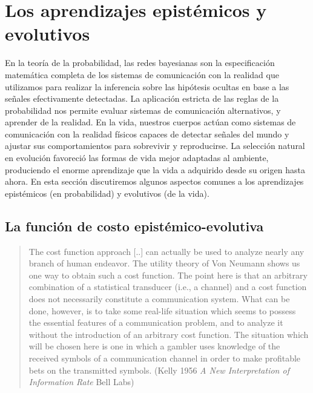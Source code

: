 \documentclass[a4paper,11pt]{book}
\theoremstyle{definition}
\begin{document}
\section{Los aprendizajes epist\'emicos y evolutivos}

En la teor\'ia de la probabilidad, las redes bayesianas son la especificaci\'on matem\'atica completa de los sistemas de comunicaci\'on con la realidad que utilizamos para realizar la inferencia sobre las hip\'otesis ocultas en base a las se\~nales efectivamente detectadas.
%
La aplicaci\'on estricta de las reglas de la probabilidad nos permite evaluar sistemas de comunicaci\'on alternativos, y aprender de la realidad.
%
En la vida, nuestros cuerpos act\'uan como sistemas de comunicaci\'on con la realidad f\'isicos capaces de detectar se\~nales del mundo y ajustar sus comportamientos para sobrevivir y reproducirse.
%
La selecci\'on natural en evoluci\'on favoreci\'o las formas de vida mejor adaptadas al ambiente, produciendo el enorme aprendizaje que la vida a adquirido desde su origen hasta ahora.
%
En esta secci\'on discutiremos algunos aspectos comunes a los aprendizajes epist\'emicos (en probabilidad) y evolutivos (de la vida).

\subsection{La funci\'on de costo epist\'emico-evolutiva}

\begin{quotation}
The cost function approach [..] can actually be used to analyze nearly any branch of human endeavor.
The utility theory of Von Neumann shows us one way to obtain such a cost function.
The point here is that an arbitrary combination of a statistical transducer (i.e., a channel) and a cost function does not necessarily constitute a communication system.
What can be done, however, is to take some real-life situation which seems to possess the essential features of a communication problem, and to analyze it without the introduction of an arbitrary cost function.
The situation which will be chosen here is one in which a gambler uses knowledge of the received symbols of a communication channel in order to make profitable bets on the transmitted symbols. (Kelly 1956 \emph{A New Interpretation of Information Rate} Bell Labs)
\end{quotation}
\end{document}
